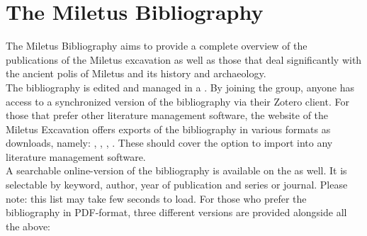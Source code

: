\documentclass[a4paper]{scrartcl}
\newcommand{\redhref}[2]{\href{#1}{\color{uhhred}{#2}}}
\begin{document}
\thispagestyle{empty}

\section*{The Miletus Bibliography}

The Miletus Bibliography aims to provide a complete overview of the publications of the Miletus excavation as well as those that deal significantly with the ancient polis of Miletus and its history and archaeology.\\

The bibliography is edited and managed in a \redhref{https://www.zotero.org/groups/4475959/milet_bibliography}{publicly accessible Zotero group library}. By joining the group, anyone has access to a synchronized version of the bibliography via their Zotero client. For those that prefer other literature management software, the website of the Miletus Excavation offers exports of the bibliography in various formats as downloads, namely: \redhref{https://raw.github.com/lsteinmann/Miletus_Bibliography/main/data/Milet_Bibliography_BibLaTeX.bib}{BibLaTeX}, \redhref{https://raw.github.com/lsteinmann/Miletus_Bibliography/main/data/Milet_Bibliography_BibTeX.bib}{BibTeX}, \redhref{https://raw.github.com/lsteinmann/Miletus_Bibliography/main/data/Milet_Bibliography_CSV.csv}{CSV}, \redhref{https://raw.github.com/lsteinmann/Miletus_Bibliography/main/data/Milet_Bibliography_RIS.ris}{RIS}. These should cover the option to import into any literature management software.\\

A searchable online-version of the bibliography is available on the \redhref{https://www.miletgrabung.uni-hamburg.de/material/bibliographie.html}{homepage of the Miletus Excavation} as well. It is selectable by keyword, author, year of publication and series or journal. Please note: this list may take few seconds to load. For those who prefer the bibliography in PDF-format, three different versions are provided alongside all the above: 
\end{document}
